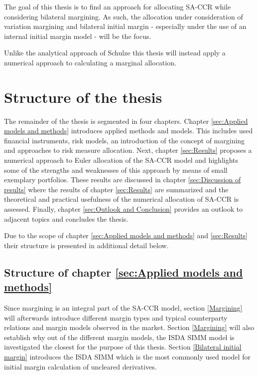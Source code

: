 \documentclass[../Thesis_AHoecherl.tex]{subfiles}
\begin{document}
    The goal of this thesis is to find an approach for allocating \gls{SA-CCR} while considering bilateral margining. As such, the allocation under consideration of variation margining and bilateral initial margin - especially under the use of an internal initial margin model - will be the focus.

    Unlike the analytical approach of Schulze \cite{schulze2018capital} this thesis will instead apply a numerical approach to calculating a marginal allocation.
    


    \section{Structure of the thesis}

    The remainder of the thesis is segmented in four chapters. Chapter \ref{sec:Applied models and methods} introduces applied methods and models.
    This includes used financial instruments, risk models, an introduction of the concept of margining and approaches to risk measure allocation.
    Next, chapter \ref{sec:Results} proposes a numerical approach to Euler allocation of the \gls{SA-CCR} model and highlights some of the strengths and weaknesses of this approach by means of small exemplary portfolios.
    These results are discussed in chapter \ref{sec:Discussion of results} where the results of chapter \ref{sec:Results} are summarized and the theoretical and practical usefulness of the numerical allocation of \gls{SA-CCR} is assessed.
    Finally, chapter \ref{sec:Outlook and Conclusion} provides an outlook to adjacent topics and concludes the thesis.

    Due to the scope of chapter \ref{sec:Applied models and methods} and \ref{sec:Results} their structure is presented in additional detail below.

    \subsection{Structure of chapter \ref{sec:Applied models and methods}}
    
    Since margining is an integral part of the \gls{SA-CCR} model, section \ref{Margining} will afterwards introduce different margin types and typical counterparty relations and margin models observed in the market. Section \ref{Margining} will also establish why out of the different margin models, the \gls{ISDA SIMM} model is investigated the closest for the purpose of this thesis.
    Section \ref{Bilateral initial margin} introduces the \gls{ISDA SIMM} which is the most commonly used model for initial margin calculation of uncleared derivatives.
\end{document}
